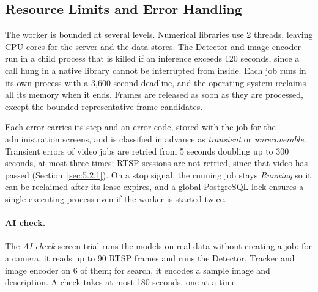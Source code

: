 \subsection{Resource Limits and Error Handling}
\label{sec:6.2.2}

The worker is bounded at several levels. Numerical libraries use 2 threads, leaving CPU cores for the server and the data stores. The Detector and image encoder run in a child process that is killed if an inference exceeds 120 seconds, since a call hung in a native library cannot be interrupted from inside. Each job runs in its own process with a 3,600-second deadline, and the operating system reclaims all its memory when it ends. Frames are released as soon as they are processed, except the bounded representative frame candidates.

Each error carries its step and an error code, stored with the job for the administration screens, and is classified in advance as \emph{transient} or \emph{unrecoverable}. Transient errors of video jobs are retried from 5 seconds doubling up to 300 seconds, at most three times; RTSP sessions are not retried, since that video has passed (Section~\ref{sec:5.2.1}). On a stop signal, the running job stays \emph{Running} so it can be reclaimed after its lease expires, and a global PostgreSQL lock ensures a single executing process even if the worker is started twice.

\paragraph{AI check.}\label{sec:6.2.5} The \emph{AI check} screen trial-runs the models on real data without creating a job: for a camera, it reads up to 90 RTSP frames and runs the Detector, Tracker and image encoder on 6 of them; for search, it encodes a sample image and description. A check takes at most 180 seconds, one at a time.
